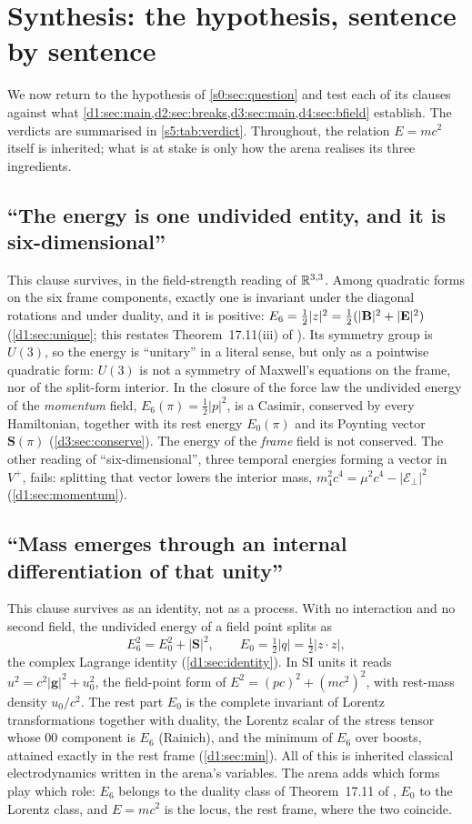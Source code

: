 \section{Synthesis: the hypothesis, sentence by sentence}
\label{s5:sec:synthesis}

We now return to the hypothesis of \cref{s0:sec:question} and test each of its clauses against what
\cref{d1:sec:main,d2:sec:breaks,d3:sec:main,d4:sec:bfield} establish. The verdicts are summarised in \cref{s5:tab:verdict}. Throughout,
the relation $E=mc^2$ itself is inherited; what is at stake is only how the arena realises its three ingredients.

\subsection{``The energy is one undivided entity, and it is six-dimensional''}

This clause survives, in the field-strength reading of $\mathbb{R}^{3,3}$. Among quadratic forms on the six frame components, exactly one is
invariant under the diagonal rotations and under duality, and it is positive: $E_6=\tfrac12|z|^2=\tfrac12(|\mathbf B|^2+|\mathbf E|^2)$
(\cref{d1:sec:unique}; this restates Theorem~17.11(iii) of \cite{ES17}). Its symmetry group is $U(3)$, so the energy is ``unitary'' in a
literal sense, but only as a pointwise quadratic form: $U(3)$ is not a symmetry of Maxwell's equations on the frame, nor of the
split-form interior. In the closure of the force law the undivided energy of the \emph{momentum} field, $E_6(\pi)=\tfrac12|p|^2$, is a
Casimir, conserved by every Hamiltonian, together with its rest energy $E_0(\pi)$ and its Poynting vector $\mathbf S(\pi)$
(\cref{d3:sec:conserve}). The energy of the \emph{frame} field is not conserved. The other reading of ``six-dimensional'', three temporal
energies forming a vector in $V^+$, fails: splitting that vector lowers the interior mass, $m_4^2c^4=\mu^2c^4-|\mathcal E_\perp|^2$
(\cref{d1:sec:momentum}).

\subsection{``Mass emerges through an internal differentiation of that unity''}

This clause survives as an identity, not as a process. With no interaction and no second field, the undivided energy of a field point
splits as
\[
E_6^2=E_0^2+|\mathbf S|^2,\qquad E_0=\tfrac12|q|=\tfrac12|z\cdot z|,
\]
the complex Lagrange identity (\cref{d1:sec:identity}). In SI units it reads $u^2=c^2|\mathbf g|^2+u_0^2$, the field-point form of
$E^2=(pc)^2+(mc^2)^2$, with rest-mass density $u_0/c^2$. The rest part $E_0$ is the complete invariant of Lorentz transformations together
with duality, the Lorentz scalar of the stress tensor whose $00$ component is $E_6$ (Rainich), and the minimum of $E_6$ over boosts,
attained exactly in the rest frame (\cref{d1:sec:min}). All of this is inherited classical electrodynamics written in the arena's
variables. The arena adds which forms play which role: $E_6$ belongs to the duality class of Theorem~17.11 of \cite{ES17}, $E_0$ to the
Lorentz class, and $E=mc^2$ is the locus, the rest frame, where the two coincide.

